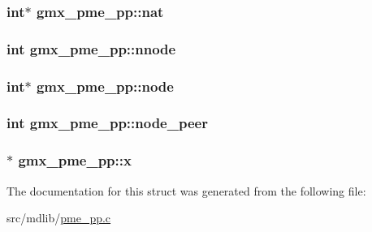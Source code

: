 \hypertarget{structgmx__pme__pp_a58221d0c707a3622d907527000e6c75d}{
\subsubsection[{nat}]{\setlength{\rightskip}{0pt plus 5cm}int$\ast$ {\bf gmx\-\_\-pme\-\_\-pp\-::nat}}}\label{structgmx__pme__pp_a58221d0c707a3622d907527000e6c75d}
\hypertarget{structgmx__pme__pp_ab8beb115201c2ca17a30bec941a866d2}{
\subsubsection[{nnode}]{\setlength{\rightskip}{0pt plus 5cm}int {\bf gmx\-\_\-pme\-\_\-pp\-::nnode}}}\label{structgmx__pme__pp_ab8beb115201c2ca17a30bec941a866d2}
\hypertarget{structgmx__pme__pp_a8d8cf41544555e7c99385052e2afeebd}{
\subsubsection[{node}]{\setlength{\rightskip}{0pt plus 5cm}int$\ast$ {\bf gmx\-\_\-pme\-\_\-pp\-::node}}}\label{structgmx__pme__pp_a8d8cf41544555e7c99385052e2afeebd}
\hypertarget{structgmx__pme__pp_a7ae7bd537376241cf862eecf7b86a39a}{
\subsubsection[{node\-\_\-peer}]{\setlength{\rightskip}{0pt plus 5cm}int {\bf gmx\-\_\-pme\-\_\-pp\-::node\-\_\-peer}}}\label{structgmx__pme__pp_a7ae7bd537376241cf862eecf7b86a39a}
\hypertarget{structgmx__pme__pp_a7edcbe9e32d13e50736c60a9f0b0382b}{
\subsubsection[{x}]{$\ast$ {\bf gmx\-\_\-pme\-\_\-pp\-::x}}}\label{structgmx__pme__pp_a7edcbe9e32d13e50736c60a9f0b0382b}


\-The documentation for this struct was generated from the following file\-:\begin{DoxyCompactItemize}
\item 
src/mdlib/\hyperlink{pme__pp_8c}{pme\-\_\-pp.\-c}\end{DoxyCompactItemize}

